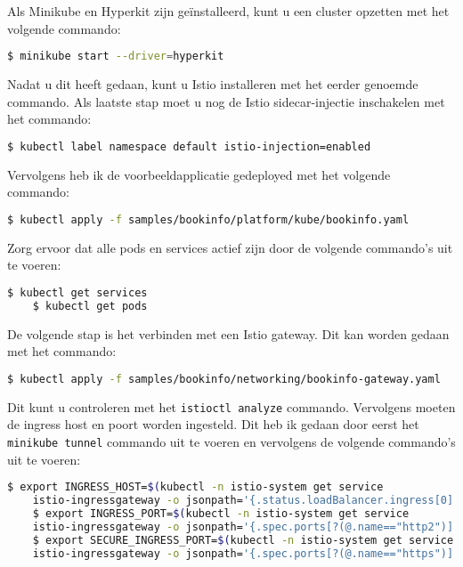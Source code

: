 Als Minikube en Hyperkit zijn geïnstalleerd, kunt u een cluster opzetten met het volgende commando:

\begin{lstlisting}[language=bash]
	$ minikube start --driver=hyperkit
\end{lstlisting}

Nadat u dit heeft gedaan, kunt u Istio installeren met het eerder genoemde commando. Als laatste stap moet u nog de Istio sidecar-injectie inschakelen met het commando:

\begin{lstlisting}[language=bash]
	$ kubectl label namespace default istio-injection=enabled
\end{lstlisting}

Vervolgens heb ik de voorbeeldapplicatie gedeployed met het volgende commando:

\begin{lstlisting}[language=bash]
	$ kubectl apply -f samples/bookinfo/platform/kube/bookinfo.yaml
\end{lstlisting}

Zorg ervoor dat alle pods en services actief zijn door de volgende commando's uit te voeren:

\begin{lstlisting}[language=bash]
	$ kubectl get services
	$ kubectl get pods
\end{lstlisting}

De volgende stap is het verbinden met een Istio gateway. Dit kan worden gedaan met het commando:

\begin{lstlisting}[language=bash]
	$ kubectl apply -f samples/bookinfo/networking/bookinfo-gateway.yaml
\end{lstlisting}

Dit kunt u controleren met het \verb|istioctl analyze| commando. Vervolgens moeten de ingress host en poort worden ingesteld. Dit heb ik gedaan door eerst het \verb|minikube tunnel| commando uit te voeren en vervolgens de volgende commando's uit te voeren:

\begin{lstlisting}[language=bash]
	$ export INGRESS_HOST=$(kubectl -n istio-system get service 
	istio-ingressgateway -o jsonpath='{.status.loadBalancer.ingress[0].ip}')
	$ export INGRESS_PORT=$(kubectl -n istio-system get service 
	istio-ingressgateway -o jsonpath='{.spec.ports[?(@.name=="http2")].port}')
	$ export SECURE_INGRESS_PORT=$(kubectl -n istio-system get service 
	istio-ingressgateway -o jsonpath='{.spec.ports[?(@.name=="https")].port}')
\end{lstlisting}

